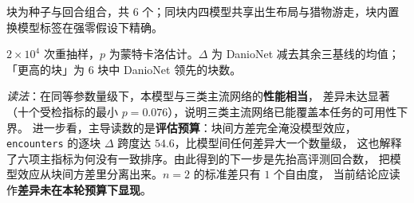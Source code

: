 \begin{table}[H]
  \centering
  \caption{块内置换检验。}
  \label{tab:expc}
  \footnotesize
\setlength{\tabcolsep}{1pt}
  \begin{threeparttable}
  \begin{tablenotes}\footnotesize\raggedright
    \item 块为种子与回合组合，共 $6$ 个；同块内四模型共享出生布局与猎物游走，块内置换模型标签在强零假设下精确。
    \item $2\times10^{4}$ 次重抽样，$p$ 为蒙特卡洛估计。$\Delta$ 为 DanioNet 减去其余三基线的均值；「更高的块」为 $6$ 块中 DanioNet 领先的块数。
  \end{tablenotes}
  \end{threeparttable}
\end{table}

\emph{读法}：在同等参数量级下，本模型与三类主流网络的\textbf{性能相当}，
差异未达显著（十个受检指标的最小 $p=0.076$），说明三类主流网络已能覆盖本任务的可用性下界。
进一步看，主导读数的是\textbf{评估预算}：块间方差完全淹没模型效应，
\texttt{encounters} 的逐块 $\Delta$ 跨度达 $54.6$，比模型间任何差异大一个数量级，
这也解释了六项主指标为何没有一致排序。由此得到的下一步是先抬高评测回合数，
把模型效应从块间方差里分离出来。$n=2$ 的标准差只有 $1$ 个自由度，
当前结论应读作\textbf{差异未在本轮预算下显现}。

